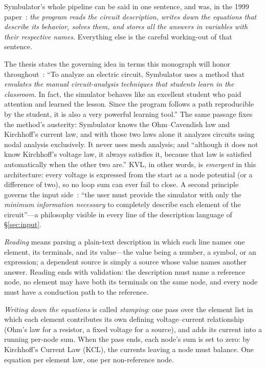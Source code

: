 \documentclass[11pt,oneside]{report}
\begin{document}
Symbulator's whole pipeline can be said in one sentence, and was, in
the 1999 paper~\cite{paper1999}: \emph{the program reads the circuit
description, writes down the equations that describe its behavior,
solves them, and stores all the answers in variables with their
respective names.} Everything else is the careful working-out of that
sentence.

The thesis states the governing idea in terms this monograph will
honor throughout~\cite[\S1.4]{thesis2000}: ``To analyze an electric
circuit, Symbulator uses a method that \emph{emulates the manual
circuit-analysis techniques that students learn in the
classroom}. In fact, the simulator behaves like an excellent student
who paid attention and learned the lesson. Since the program follows
a path reproducible by the student, it is also a very powerful
learning tool.'' The same passage fixes the method's austerity:
Symbulator knows the Ohm--Cavendish law and Kirchhoff's current law,
and with those two laws alone it analyzes circuits using nodal
analysis exclusively. It never uses mesh analysis; and ``although it
does not know Kirchhoff's voltage law, it always satisfies it,
because that law is satisfied automatically when the other two
are.'' KVL, in other words, is \emph{emergent} in this architecture:
every voltage is expressed from the start as a node potential (or a
difference of two), so no loop sum can ever fail to close. A second
principle governs the input side~\cite[\S1.8.1]{thesis2000}: ``the
user must provide the simulator with only the \emph{minimum
information necessary} to completely describe each element of the
circuit''---a philosophy visible in every line of the description
language of \S\ref{sec:input}.

\emph{Reading} means parsing a plain-text description in which each
line names one element, its terminals, and its value---the value being
a number, a symbol, or an expression; a dependent source is simply a
source whose value names another answer. Reading ends with validation:
the description must name a reference node, no element may have both
its terminals on the same node, and every node must have a conduction
path to the reference.

\emph{Writing down the equations} is called \emph{stamping}: one pass
over the element list in which each element contributes its own
defining voltage--current relationship (Ohm's law for a resistor, a
fixed voltage for a source), and adds its current into a running
per-node sum. When the pass ends, each node's sum is set to zero: by
Kirchhoff's Current Law (KCL), the currents leaving a node must
balance. One equation per element law, one per non-reference node.
\end{document}
